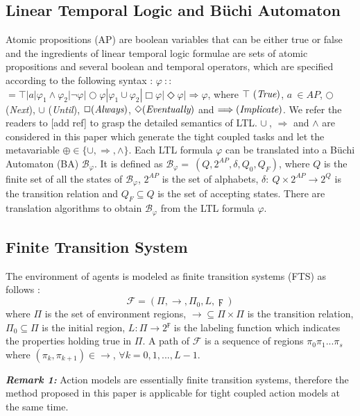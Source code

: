 \documentclass[journal]{IEEEtran}
\begin{document}
\subsection{Linear Temporal Logic and B\"{u}chi Automaton}
Atomic propositions (AP) are boolean variables that can be either true or false and the
ingredients of linear temporal logic formulae are sets of atomic propositions and several
boolean and temporal operators, which are specified according to the following syntax
\cite{baier2008principles}: $\varphi\ $$:$$:$$=\top|a|\varphi_1\wedge\varphi_2| \neg \varphi|\bigcirc\varphi|\varphi_1\cup\varphi_2|\Box\varphi|\Diamond\varphi|\Longrightarrow\varphi$, where $\top\ (\emph{True})$, $a\ \in AP$, $\bigcirc$ (\emph{Next}), $\cup$ (\emph{Until}), $\Box (\emph{Always})$,  $\Diamond (\emph{Eventually})$ and $\Longrightarrow (\emph{Implicate})$. We refer the readers to [add ref] to grasp the detailed semantics of LTL. $\cup\ $, $\Longrightarrow$ and $\wedge$ are considered in this paper which generate the tight coupled tasks and let the metavariable $\oplus \in \{\cup, \Longrightarrow,\wedge\}$.
Each LTL formula $\varphi$ can be translated into a B\"{u}chi Automaton (BA) $\mathcal{B}_\varphi$. It is defined as $\mathcal{B}_\varphi=\ (Q,2^{AP},\delta,Q_0,Q_F)$, where $Q$ is the finite set of all the states of $\mathcal{B}_\varphi$, $2^{AP}$ is the set of alphabets, $\delta:\ Q\times 2^{AP}\rightarrow 2^Q$ is the transition relation and $Q_F \subseteq Q$ is the set of accepting states. There are translation algorithms \cite{GASTIN2001Fast} to obtain $\mathcal{B}_\varphi$ from the LTL formula $\varphi$.
\subsection{Finite Transition System}
The environment of agents is modeled as finite transition systems (FTS) as follows \cite{baier2008principles}:
$$\mathcal{F}=(\Pi,\rightarrow,\Pi_0,L,\digamma)$$
where $\Pi$ is the set of environment regions, $\rightarrow \subseteq \Pi \times \Pi$ is the transition relation, $\Pi_0 \subseteq \Pi$ is the initial region, $L:\Pi\rightarrow 2^{\digamma}$ is the labeling function which indicates the properties holding true in $\Pi$. A path of $\mathcal{F}$ is a sequence of regions $\pi_0 \pi_1 ...\pi_s$ where $(\pi_k,\pi_{k+1})\in \rightarrow$, $\forall k=0,1,...,L-1$.

\textbf{\emph{Remark 1:}} Action models are essentially finite transition systems, therefore the method proposed in this paper is applicable for tight coupled action models at the same time.
\end{document}
